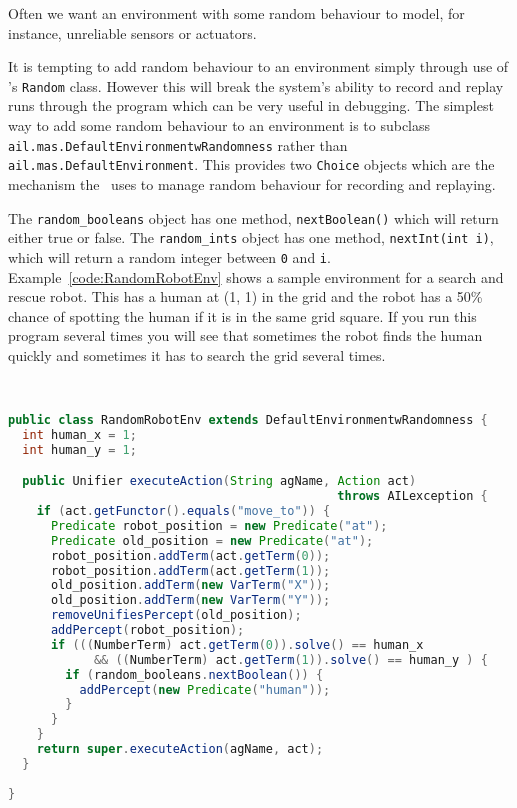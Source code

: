 Often we want an environment with some random behaviour to model, for instance, unreliable sensors or actuators.

\begin{sloppypar}
It is tempting to add random behaviour to an environment simply through use of \java's \texttt{Random} class.  However this will break the system's ability to record and replay runs through the program which can be very useful in debugging.  The simplest way to add some random behaviour to an environment is to subclass \texttt{ail.mas.DefaultEnvironmentwRandomness} rather than \texttt{ail.mas.DefaultEnvironment}.  This provides two \texttt{Choice} objects which are the mechanism the \ail\ uses to manage random behaviour for recording and replaying.
\end{sloppypar}

The \texttt{random\_booleans} object has one method, \texttt{nextBoolean()} which will return either true or false.  The \texttt{random\_ints} object has one method, \texttt{nextInt(int i)}, which will return a random integer between \texttt{0} and \texttt{i}.  Example~\ref{code:RandomRobotEnv} shows a sample environment for a search and rescue robot.  This has a human at (1, 1) in the grid and the robot has a 50\% chance of spotting the human if it is in the same grid square.   If you run this program several times you will see that sometimes the robot finds the human quickly and sometimes it has to search the grid several times.

\begin{ourexample}
\label{code:RandomRobotEnv} \quad \\
\begin{lstlisting}[basicstyle=\sffamily,language=Java,style=easslisting]
public class RandomRobotEnv extends DefaultEnvironmentwRandomness {
  int human_x = 1;
  int human_y = 1;

  public Unifier executeAction(String agName, Action act) 
                                              throws AILexception {
    if (act.getFunctor().equals("move_to")) {
      Predicate robot_position = new Predicate("at");
      Predicate old_position = new Predicate("at");
      robot_position.addTerm(act.getTerm(0));
      robot_position.addTerm(act.getTerm(1));
      old_position.addTerm(new VarTerm("X"));
      old_position.addTerm(new VarTerm("Y"));
      removeUnifiesPercept(old_position);
      addPercept(robot_position);
      if (((NumberTerm) act.getTerm(0)).solve() == human_x 
            && ((NumberTerm) act.getTerm(1)).solve() == human_y ) {
        if (random_booleans.nextBoolean()) {
          addPercept(new Predicate("human"));
        }
      }
    }
    return super.executeAction(agName, act);
  }
	      
}
\end{lstlisting}
\end{ourexample}

